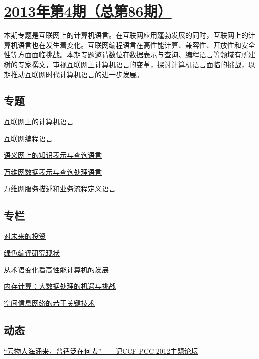 \documentclass[a4paper]{article}
\begin{document}
\section{\href{http://history.ccf.org.cn/sites/ccf/jsjtbbd.jsp?contentId=2732460526829}{\textbf{2013年第4期（总第86期）}}}
本期专题是互联网上的计算机语言。在互联网应用蓬勃发展的同时，互联网上的计算机语言也在发生着变化。互联网编程语言在高性能计算、兼容性、开放性和安全性等方面面临挑战。本期专题邀请数位在数据表示与查询、编程语言等领域有所建树的专家撰文，审视互联网上计算机语言的变革，探讨计算机语言面临的挑战，以期推动互联网时代计算机语言的进一步发展。
\subsection{专题}
\href{http://history.ccf.org.cn/resources/1190201776262/2013/04/18/1.pdf}{互联网上的计算机语言}

\href{http://history.ccf.org.cn/resources/1190201776262/2013/04/18/5.pdf}{互联网编程语言}

\href{http://history.ccf.org.cn/resources/1190201776262/2013/04/18/4.pdf}{语义网上的知识表示与查询语言}

\href{http://history.ccf.org.cn/resources/1190201776262/2013/04/18/2.pdf}{万维网数据表示与查询处理语言}

\href{http://history.ccf.org.cn/resources/1190201776262/2013/04/18/3.pdf}{万维网服务描述和业务流程定义语言}

\subsection{专栏}
\href{http://history.ccf.org.cn/resources/1190201776262/2013/04/18/10.pdf}{对未来的投资}

\href{http://history.ccf.org.cn/resources/1190201776262/2013/04/18/9.pdf}{绿色编译研究现状}

\href{http://history.ccf.org.cn/resources/1190201776262/2013/04/18/6.pdf}{从术语变化看高性能计算机的发展}

\href{http://history.ccf.org.cn/resources/1190201776262/2013/04/18/7.pdf}{内存计算：大数据处理的机遇与挑战}

\href{http://history.ccf.org.cn/resources/1190201776262/2013/04/18/8.pdf}{空间信息网络的若干关键技术}

\subsection{动态}
\href{http://history.ccf.org.cn/resources/1190201776262/2013/04/18/11.pdf}{“云物人海涌来，普适泛在何去”——记CCF PCC 2012主题论坛}
\end{document}
